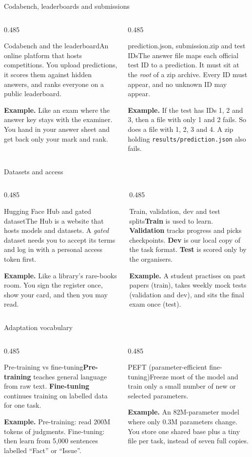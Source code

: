\documentclass[aspectratio=169,11pt]{beamer}
\newcommand{\code}[1]{\texttt{\small #1}}
\newcommand{\term}[3]{%
  \begin{block}{#1}\small #2\par\vspace{1mm}%
  {\color{exgreen}\textbf{Example.}} #3\end{block}}
\newcommand{\twoterms}[6]{%
  \begin{columns}[T]
    \begin{column}{0.485\textwidth}\term{#1}{#2}{#3}\end{column}
    \begin{column}{0.485\textwidth}\term{#4}{#5}{#6}\end{column}
  \end{columns}}
\begin{document}
\begin{frame}{Codabench, leaderboards and submissions}
  \twoterms{Codabench and the leaderboard}
  {An online platform that hosts competitions. You upload predictions, it scores them against hidden answers, and ranks everyone on a public leaderboard.}
  {Like an exam where the answer key stays with the examiner. You hand in your answer sheet and get back only your mark and rank.}
  {prediction.json, submission.zip and test IDs}
  {The answer file maps each official test ID to a prediction. It must sit at the \emph{root} of a zip archive. Every ID must appear, and no unknown ID may appear.}
  {If the test has IDs 1, 2 and 3, then a file with only 1 and 2 fails. So does a file with 1, 2, 3 and 4. A zip holding \code{results/prediction.json} also fails.}
\end{frame}

\begin{frame}{Datasets and access}
  \twoterms{Hugging Face Hub and gated dataset}
  {The Hub is a website that hosts models and datasets. A \emph{gated} dataset needs you to accept its terms and log in with a personal access token first.}
  {Like a library's rare-books room. You sign the register once, show your card, and then you may read.}
  {Train, validation, dev and test splits}
  {\textbf{Train} is used to learn. \textbf{Validation} tracks progress and picks checkpoints. \textbf{Dev} is our local copy of the task format. \textbf{Test} is scored only by the organisers.}
  {A student practises on past papers (train), takes weekly mock tests (validation and dev), and sits the final exam once (test).}
\end{frame}

\begin{frame}{Adaptation vocabulary}
  \twoterms{Pre-training vs fine-tuning}
  {\textbf{Pre-training} teaches general language from raw text. \textbf{Fine-tuning} continues training on labelled data for one task.}
  {Pre-training: read 200M tokens of judgments. Fine-tuning: then learn from 5,000 sentences labelled ``Fact'' or ``Issue''.}
  {PEFT (parameter-efficient fine-tuning)}
  {Freeze most of the model and train only a small number of new or selected parameters.}
  {An 82M-parameter model where only 0.3M parameters change. You store one shared base plus a tiny file per task, instead of seven full copies.}
\end{frame}
\end{document}
